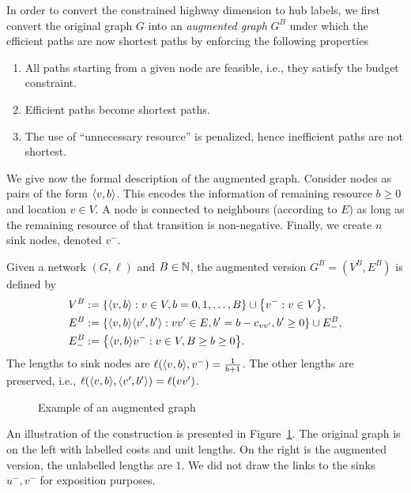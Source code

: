 In order to convert the constrained highway dimension to hub labels, we first convert the original graph $G$ into an \emph{augmented graph} $G^B$ under which the efficient paths are now shortest paths by enforcing the following properties
\begin{enumerate}[nosep]
\item All paths starting from a given node are feasible, i.e., they satisfy the budget constraint.
\item Efficient paths become shortest paths.
\item The use of ``unnecessary resource'' is penalized, hence inefficient paths are not shortest.
\end{enumerate}

We give now the formal description of the augmented graph.
Consider nodes as pairs of the form $\langle v,b\rangle$. 
This encodes the information of remaining resource $b\geq 0$ and location $v\in V$.
A node is connected to neighbours (according to $E$) as long as the remaining resource of that transition is non-negative.
Finally, we create $n$ sink nodes, denoted $v^-$.


\begin{definition}
Given a network $(G,\ell)$ and $B\in\mathbb{N}$, the augmented version $G^B=(V^B,E^B)$ is defined by
\begin{align*}
V^B &:=\crl*{\pp{v,b}: v\in V, b=0,1,\ldots,B}\cup\crl*{v^-:v\in V},\\
E^B &:=\crl*{\pp{v,b}\pp{v',b'} : vv'\in E, b'=b-c_{vv'}, b'\geq 0}\cup E^{B}_{-},\\
E^{B}_{-} &:= \crl*{\pp{v,b}v^-: v\in V, B\geq b\geq 0}.
\end{align*}
The lengths to sink nodes are $\ell(\langle v,b\rangle,v^-)=\frac{1}{b+1}$.
The other lengths are preserved, i.e., $\ell(\langle v,b\rangle,\langle v',b'\rangle)=\ell(vv')$.
\end{definition}

\begin{figure}\caption{Example of an augmented graph}\label{fig:augmented}

\end{figure}

An illustration of the construction is presented in Figure~\ref{fig:augmented}.
The original graph is on the left with labelled costs and unit lengths.
On the right is the augmented version, the unlabelled lengths are $1$.
We did not draw the links to the sinks $u^-,v^-$ for exposition purposes. 


